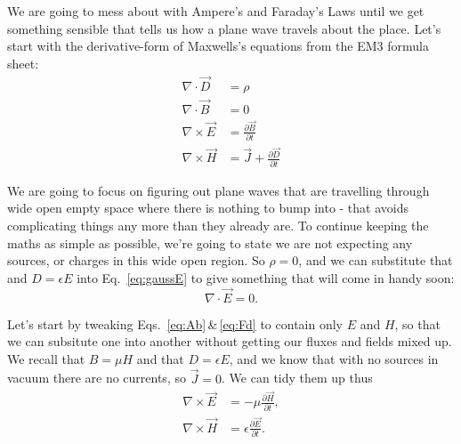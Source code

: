 \documentclass{tufte-handout}
\begin{document}
We are going to mess about with Ampere's and Faraday's Laws until we get something sensible that tells us how a plane wave travels about the place. Let's start with the derivative-form of Maxwells's equations from the EM3 formula sheet:
\begin{align}
\nabla\cdot\vec{D} & = \rho \label{eq:gaussE}\\
\nabla\cdot\vec{B }& = 0 \label{eq:gaussM}\\
\nabla\times\vec{E} & = \frac{\partial\vec{B}}{\partial t} \label{eq:Ab}\\
\nabla\times\vec{H} & = \vec{J} + \frac{\partial\vec{D}}{\partial t} \label{eq:Fd}
\end{align}

We are going to focus on figuring out plane waves that are travelling through wide open empty space where there is nothing to bump into - that avoids complicating things any more than they already are. To continue keeping the maths as simple as possible, we're going to state we are not expecting any sources, or charges in this wide open region. So $\rho=0$, and we can substitute that and $D=\epsilon{}E$ into Eq.~\ref{eq:gaussE} to give something that will come in handy soon:
\begin{equation}
\nabla\cdot\vec{E} = 0. \label{eq:gaussE0}
\end{equation}

Let's start by tweaking Eqs.~\ref{eq:Ab}\,\&\,\ref{eq:Fd} to contain only $E$ and $H$, so that we can subsitute one into another without getting our fluxes and fields mixed up. We recall that $B=\mu{}H$ and that $D=\epsilon{}E$, and we know that with no sources in vacuum there are no currents, so $\vec{J}=0$. We can tidy them up thus
\begin{align}
\nabla\times\vec{E} & = -\mu\frac{\partial\vec{H}}{\partial t}, \label{eq:curlE}\\
\nabla\times\vec{H} & = \epsilon\frac{\partial\vec{E}}{\partial t}. \label{eq:curlH} 
\end{align}
\end{document}
